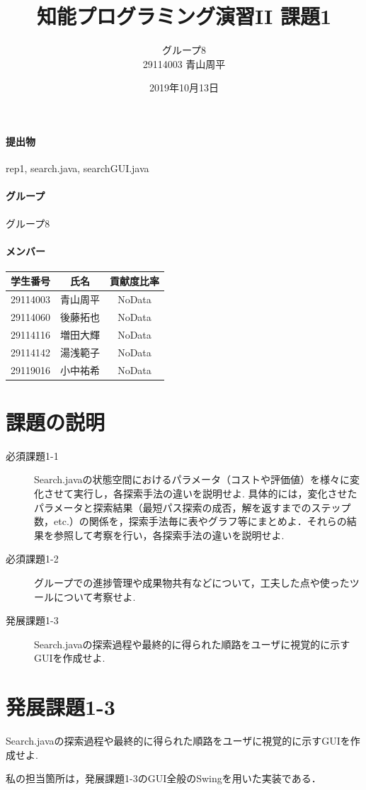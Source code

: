 \documentclass[12pt]{jarticle}
\title{知能プログラミング演習II 課題1}
\author{グループ8\\
  29114003 青山周平\\
}
\date{2019年10月13日}
\begin{document}
\maketitle

\paragraph{提出物} rep1, search.java, searchGUI.java
\paragraph{グループ} グループ8
\paragraph{メンバー}
\begin{tabular}{|c|c|c|}
  \hline
  学生番号&氏名&貢献度比率\\
  \hline\hline
  29114003&青山周平&NoData\\
  \hline
  29114060&後藤拓也&NoData\\
  \hline
  29114116&増田大輝&NoData\\
  \hline
  29114142&湯浅範子&NoData\\
  \hline
  29119016&小中祐希&NoData\\
  \hline
\end{tabular}



\section{課題の説明}
\begin{description}
\item[必須課題1-1]Search.javaの状態空間におけるパラメータ（コストや評価値）を様々に変化させて実行し，各探索手法の違いを説明せよ.
\hspace{4mm}具体的には，変化させたパラメータと探索結果（最短パス探索の成否，解を返すまでのステップ数，etc.）の関係を，探索手法毎に表やグラフ等にまとめよ．それらの結果を参照して考察を行い，各探索手法の違いを説明せよ. 
\item[必須課題1-2] グループでの進捗管理や成果物共有などについて，工夫した点や使ったツールについて考察せよ.
\item[発展課題1-3] Search.javaの探索過程や最終的に得られた順路をユーザに視覚的に示すGUIを作成せよ. 
\end{description}


\section{発展課題1-3}
\begin{screen}
Search.javaの探索過程や最終的に得られた順路をユーザに視覚的に示すGUIを作成せよ.
\end{screen}
私の担当箇所は，発展課題1-3のGUI全般のSwingを用いた実装である．
\end{document}
